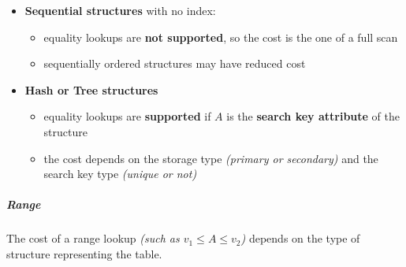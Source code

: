 \documentclass[english]{article}
\begin{document}
\begin{itemize}
  \item \textbf{Sequential structures} with no index:
        \begin{itemize}[label=\xmarkthin]
          \item equality lookups are \textbf{not supported}, so the cost is the one of a full scan
          \item sequentially ordered structures may have reduced cost
        \end{itemize}
  \item \textbf{Hash or Tree structures}
        \begin{itemize}[label=\cmarkthin]
          \item equality lookups are \textbf{supported} if \(A\) is the \textbf{search key attribute} of the structure
          \item the cost depends on the storage type \textit{(primary or secondary)} and the search key type \textit{(unique or not)}
        \end{itemize}
\end{itemize}

\subparagraph*{Range}
The cost of a range lookup \textit{(such as \(v_1 \leq A \leq v_2\))} depends on the type of structure representing the table.
\end{document}
